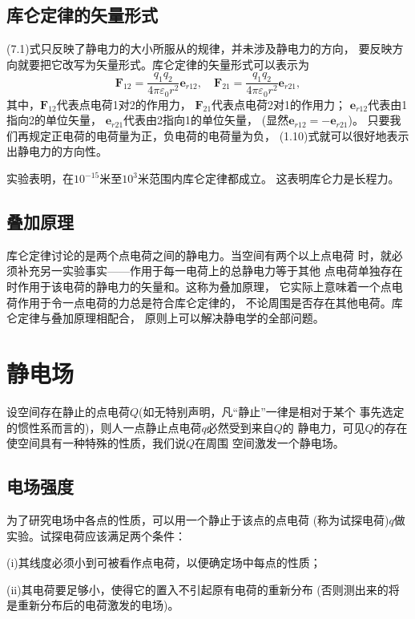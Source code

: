 \subsection{库仑定律的矢量形式}
(7.1)式只反映了静电力的大小所服从的规律，并未涉及静电力的方向，
要反映方向就要把它改写为矢量形式。库仑定律的矢量形式可以表示为
\begin{equation}
    \boldsymbol{F}_{12}=\frac{q_1q_2}{4\pi \varepsilon_0r^2}
    \boldsymbol{e}_{r12},\quad\boldsymbol{F}_{21}
    =\frac{q_1q_2}{4\pi \varepsilon_0r^2}\boldsymbol{e}_{r21},
\end{equation}
其中，$\boldsymbol{F}_{12}$代表点电荷1对2的作用力，
$\boldsymbol{F}_{21}$代表点电荷2对1的作用力；
$\boldsymbol{e}_{r12}$代表由1指向2的单位矢量，
$\boldsymbol{e}_{r21}$代表由2指向1的单位矢量，
(显然$\boldsymbol{e}_{r12}=-\boldsymbol{e}_{r21}$)。
只要我们再规定正电荷的电荷量为正，负电荷的电荷量为负，
(1.10)式就可以很好地表示出静电力的方向性。

实验表明，在$10^{-15}$米至$10^{3}$米范围内库仑定律都成立。
这表明库仑力是长程力。
\subsection{叠加原理}
库仑定律讨论的是两个点电荷之间的静电力。当空间有两个以上点电荷
时，就必须补充另一实验事实——作用于每一电荷上的总静电力等于其他
点电荷单独存在时作用于该电荷的静电力的矢量和。这称为叠加原理，
它实际上意味着一个点电荷作用于令一点电荷的力总是符合库仑定律的，
不论周围是否存在其他电荷。库仑定律与叠加原理相配合，
原则上可以解决静电学的全部问题。
\section{静电场}
设空间存在静止的点电荷$Q$(如无特别声明，凡“静止”一律是相对于某个
事先选定的惯性系而言的)，则人一点静止点电荷$q$必然受到来自$Q$的 
静电力，可见$Q$的存在使空间具有一种特殊的性质，我们说$Q$在周围
空间激发一个静电场。
\subsection{电场强度}
为了研究电场中各点的性质，可以用一个静止于该点的点电荷
(称为试探电荷)$q$做实验。试探电荷应该满足两个条件：

(i)其线度必须小到可被看作点电荷，以便确定场中每点的性质；

(ii)其电荷要足够小，使得它的置入不引起原有电荷的重新分布
(否则测出来的将是重新分布后的电荷激发的电场)。

